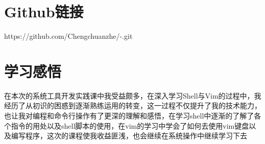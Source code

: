 \documentclass[a4paper, 12pt]{article}
\begin{document}
\section{Github链接}
https://github.com/Chengchuanzhe/-.git
\section{学习感悟}
    在本次的系统工具开发实践课中我受益颇多，在深入学习Shell与Vim的过程中，我经历了从初识的困惑到逐渐熟练运用的转变，这一过程不仅提升了我的技术能力，也让我对编程和命令行操作有了更深的理解和感悟，在学习shell中逐渐的了解了各个指令的用处以及shell脚本的使用，在vim的学习中学会了如何去使用vim键盘以及编写程序，这次的课程使我收益匪浅，也会继续在系统操作中继续学习下去
\end{document}
